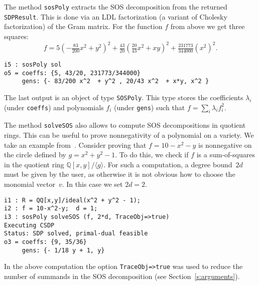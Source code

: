 \documentclass[11pt]{amsart}
\theoremstyle{plain}%
\theoremstyle{definition}
\theoremstyle{remark}
\newcommand{\SOS}{\textsc{SOS}\xspace}
\newcommand{\QQ}{\mathbb{Q}}
\begin{document}
The method \verb|sosPoly| extracts the SOS decomposition from the returned \verb|SDPResult|.
This is done via an LDL factorization (a variant of Cholesky factorization) of the Gram matrix.
For the function $f$ from above we get three squares:
\[
  f = 5(-\tfrac{83}{200} x^{2}+y^{2})^{2} + \tfrac{43}{20}
  (\tfrac{20}{43}x^{2} + xy)^{2} + \tfrac{231773}{344000} (x^{2})^{2}.
\]
{\small
\begin{verbatim}
i5 : sosPoly sol
o5 = coeffs: {5, 43/20, 231773/344000}
     gens: {- 83/200 x^2  + y^2 , 20/43 x^2  + x*y, x^2 }
\end{verbatim}
}
\noindent
The last output is an object of type \verb|SOSPoly|.
This type stores the coefficients $\lambda_{i}$ (under \verb|coeffs|) and polynomials $f_{i}$ (under \verb|gens|) such that $f = \sum_{i}\lambda_{i}f_{i}^{2}$.

The method \verb|solveSOS| also allows to compute SOS decompositions in quotient rings.
This can be useful to prove nonnegativity of a polynomial on a variety.
We take an example from~\cite{parrilo2005exploiting}.
Consider proving that $f = 10{-}x^2{-}y$ is nonnegative on the circle defined by $g = x^2 {+} y^2 {-} 1$.
To do this, we check if $f$ is a sum-of-squares in the quotient ring $\QQ[x,y]/\langle g\rangle$.
For such a computation, a degree bound~$2d$ must be given by the user, as otherwise it is not obvious how to choose the monomial vector~$v$.
In this case we set $2d=2$.
{\small
\begin{verbatim}
i1 : R = QQ[x,y]/ideal(x^2 + y^2 - 1);
i2 : f = 10-x^2-y;  d = 1;
i3 : sosPoly solveSOS (f, 2*d, TraceObj=>true)
Executing CSDP
Status: SDP solved, primal-dual feasible
o3 = coeffs: {9, 35/36}
     gens: {- 1/18 y + 1, y}
\end{verbatim}
}
\noindent
In the above computation the option \verb|TraceObj=>true| was used to reduce the number of summands in the SOS decomposition (see Section~\ref{s:arguments}).

\end{document}

